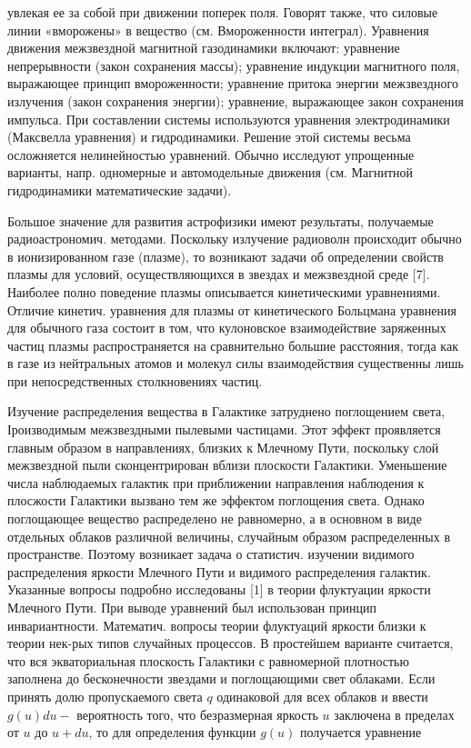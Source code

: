 \documentclass[10pt]{article}
\begin{document}
увлекая ее за собой при движении поперек поля. Говорят также, что силовые линии «вморожены» в вещество (см. Вмороженности интеграл). Уравнения движения межзвездной магнитной газодинамики включают: уравнение непрерывности (закон сохранения массы); уравнение индукции магнитного поля, выражающее принцип вмороженности; уравнение притока энергии межзвездного излучения (закон сохранения энергии); уравнение, выражающее закон сохранения импульса. При составлении системы используются уравнения электродинамики (Максвелла уравнения) и гидродинамики. Решение этой системы весьма осложняется нелинейностью уравнений. Обычно исследуют упрощенные варианты, напр. одномерные и автомодельные движения (см. Магнитной гидродинамики математические задачи).



Большое значение для развития астрофизики имеют результаты, получаемые радиоастрономич. методами. Поскольку излучение радиоволн происходит обычно в ионизированном газе (плазме), то возникают задачи об определении свойств плазмы для условий, осуществляющихся в звездах и межзвездной среде [7]. Наиболее полно поведение плазмы описывается кинетическими уравнениями. Отличие кинетич. уравнения для плазмы от кинетического Больцмана уравнения для обычного газа состоит в том, что кулоновское взаимодействие заряженных частиц плазмы распространяется на сравнительно большие расстояния, тогда как в газе из нейтральных атомов и молекул силы взаимодействия существенны лишь при непосредственных столкновениях частиц.



Изучение распределения вещества в Галактике затруднено поглощением света, Іроизводимым межзвездными пылевыми частицами. Этот эффект проявляется главным образом в направлениях, близких к Млечному Пути, поскольку слой межзвездной пыли сконцентрирован вблизи плоскости Галактики. Уменьшение числа наблюдаемых галактик при приближении направления наблюдения к плосжости Галактики вызвано тем же эффектом поглощения света. Однако поглощающее вещество распределено не равномерно, а в основном в виде отдельных облаков различной величины, случайным образом распределенных в пространстве. Поэтому возникает задача о статистич. изучении видимого распределения яркости Млечного Пути и видимого распределения галактик. Указанные вопросы подробно исследованы [1] в теории флуктуации яркости Млечного Пути. При выводе уравнений был использован принцип инвариантности. Математич. вопросы теории флуктуаций яркости близки к теории нек-рых типов случайных процессов. В простейшем варианте считается, что вся экваториальная плоскость Галактики с равномерной плотностью заполнена до бесконечности звездами и поглощающими свет облаками. Если принять долю пропускаемого света $q$ одинаковой для всех облаков и ввести $g(u) d u-$ вероятность того, что безразмерная яркость $u$ заключена в пределах от $u$ до $u+d u$, то для определения функции $g(u)$ получается уравнение
\end{document}
